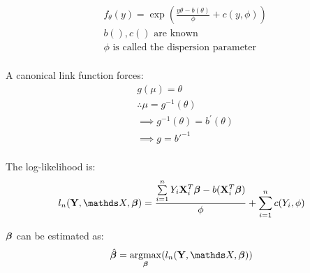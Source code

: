 \newcommand{\msigma}{\Sigma}
\newcommand{\mbeta}{\mathds{B}}

\newcommand{\argmax}{\mathop{\mathrm{argmax}}}
\newcommand{\argmin}{\mathop{\mathrm{argmin}}}

\newcommand{\deq}{:=}
\newcommand{\conv}[2]{{#1 * #2}} %
\newcommand{\abs}[1]{|{#1}|}
\newcommand{\ind}[1]{\mathds{1}(#1)} %
\newcommand{\PP}{\mathrm{P}} %
\newcommand{\EE}{\mathrm{E}} %



\begin {equation} \begin {split} 
& f_\theta(y) = \exp (\frac {y \theta - b(\theta)} {\phi} + c(y, \phi)) \\
& b(), c() \text { are known}  \\
&\text {$\phi$ is called the dispersion parameter} \\
\end {split} \end {equation}

A canonical link function forces:
\begin {equation} \begin {split}
& g(\mu) = \theta \\
& \therefore \mu = g^{-1}(\theta) \\
& \implies g^{-1}(\theta) =  b^{'}(\theta) \\
& \implies g = b{'}^{-1} \\
\end {split} \end {equation}

The log-likelihood is:
\begin {equation} \begin {split} 
l_n(\vY, \mX, \vbeta) = \frac { \sum \limits_{i=1}^{n} Y_i \vX_i^T \vbeta -b(\vX_i^T \vbeta) } {\phi}  + \sum \limits_{i=1}^{n} c(Y_i, \phi) \\
\end {split} \end {equation}

$\bm{\beta}$ can be estimated as:
\begin {equation} \begin {split}
& \hat \vbeta = \argmax_{\vbeta} (l_n(\vY, \mX, \vbeta)) \\
\end {split} \end {equation}


